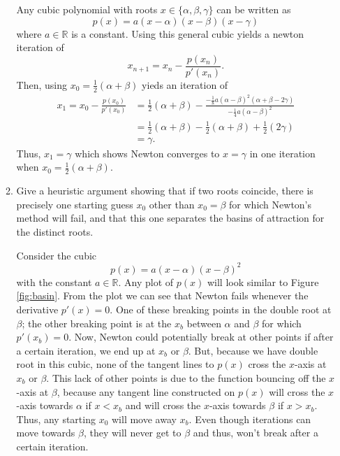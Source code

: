 \documentclass[a4paper,12pt]{article}
\newcommand{\reals}{\mathbb{R}}
\begin{document}
\begin{enumerate}[label = \arabic*.]
\begin{enumerate}[label = \roman*.]
			Any cubic polynomial with roots $ x \in \{\alpha, \beta, \gamma \} $ can be written as
			\[
				p(x) = a (x - \alpha)(x - \beta)(x - \gamma)
			\]
			where $ a \in \reals $ is a constant. Using this general cubic yields a newton iteration of
			\[
				x_{n+1} = x_n - \frac{p(x_n)}{p'(x_n)}.
			\]
			Then, using $ x_0 = \frac{1}{2}(\alpha + \beta) $ yieds an iteration of
			\begin{align*}
				x_1 = x_0 - \frac{p(x_0)}{p'(x_0)} &= \frac{1}{2}(\alpha + \beta)  - \frac{-\frac{1}{8} a (\alpha - \beta)^2 (\alpha + \beta - 2\gamma)}{-\frac{1}{4} a (\alpha - \beta)^2} \\
				&= \frac{1}{2}(\alpha + \beta)  - \frac{1}{2}(\alpha + \beta) + \frac{1}{2} (2\gamma) \\
				&= \gamma.
			\end{align*}
			Thus, $ x_1 = \gamma $ which shows Newton converges to $ x = \gamma $ in one iteration when $ x_0 = \frac{1}{2}(\alpha + \beta) $.
			
			\item Give a heuristic argument showing that if two roots coincide, there is precisely one starting guess $ x_0 $ other than $ x_0 = \beta $ for which Newton's method will fail, and that this one separates the basins of attraction for the distinct roots.
			
			Consider the cubic
			\[
				p(x) = a (x - \alpha)(x - \beta)^2
			\]
			with the constant $ a \in \reals$.  Any plot of $ p(x) $ will look similar to Figure \ref{fig:basin}. From the plot we can see that Newton fails whenever the derivative $ p'(x) = 0 $. One of these breaking points in the double root at $ \beta $; the other breaking point is at the $ x_b $ between $ \alpha $ and $ \beta $ for which $ p'(x_b) = 0 $. Now, Newton could potentially break at other points if after a certain iteration, we end up at $ x_b $ or $ \beta $. But, because we have double root in this cubic, none of the tangent lines to $ p(x) $ cross the $ x $-axis at $ x_b $ or $ \beta $. This lack of other points is due to the function bouncing off the $ x $-axis at $ \beta $, because any tangent line constructed on $ p(x) $ will cross the $ x $-axis towards $ \alpha $ if $ x < x_b $ and will cross the $ x $-axis towards $ \beta $ if $ x > x_b $. Thus, any starting $ x_0 $ will move away $ x_b $. Even though iterations can move towards $ \beta $, they will never get to $ \beta $ and thus, won't break after a certain iteration.
			

\end{enumerate}
\end{enumerate}
\end{document}
